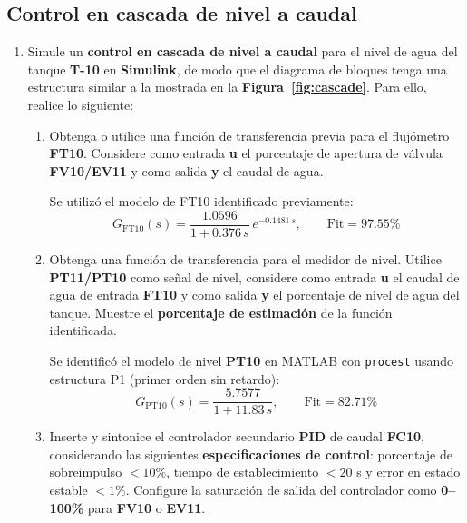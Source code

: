 \begin{enumerate}[label=\arabic*)]
\subsection{Control en cascada de nivel a caudal}
\begin{enumerate}[label=\arabic*)]
    \item Simule un \textbf{control en cascada de nivel a caudal} para el nivel de agua del tanque \textbf{T-10} en \textbf{Simulink}, de modo que el diagrama de bloques tenga una estructura similar a la mostrada en la \textbf{Figura~\ref{fig:cascade}}. Para ello, realice lo siguiente:
    \begin{enumerate}[label=\alph*.]
        \item Obtenga o utilice una función de transferencia previa para el flujómetro \textbf{FT10}. Considere como entrada \textbf{u} el porcentaje de apertura de válvula \textbf{FV10/EV11} y como salida \textbf{y} el caudal de agua.

        Se utilizó el modelo de FT10 identificado previamente:
        \begin{equation*}
            G_{\text{FT10}}(s) = \dfrac{1.0596}{1 + 0.376\, s}\, e^{-0.1481\, s}, \qquad \text{Fit} = 97.55\%
        \end{equation*}

        \item Obtenga una función de transferencia para el medidor de nivel. Utilice \textbf{PT11/PT10} como señal de nivel, considere como entrada \textbf{u} el caudal de agua de entrada \textbf{FT10} y como salida \textbf{y} el porcentaje de nivel de agua del tanque. Muestre el \textbf{porcentaje de estimación} de la función identificada.

        Se identificó el modelo de nivel \textbf{PT10} en MATLAB con \texttt{procest} usando estructura P1 (primer orden sin retardo):
        \begin{equation*}
            G_{\text{PT10}}(s) = \dfrac{5.7577}{1 + 11.83\, s}, \qquad \text{Fit} = 82.71\%
        \end{equation*}

        \item Inserte y sintonice el controlador secundario \textbf{PID} de caudal \textbf{FC10}, considerando las siguientes \textbf{especificaciones de control}: porcentaje de sobreimpulso \(<10\%\), tiempo de establecimiento \(<20\) s y error en estado estable \(<1\%\). Configure la saturación de salida del controlador como \textbf{0--100\%} para \textbf{FV10} o \textbf{EV11}.


\end{enumerate}
\end{enumerate}
\end{enumerate}
